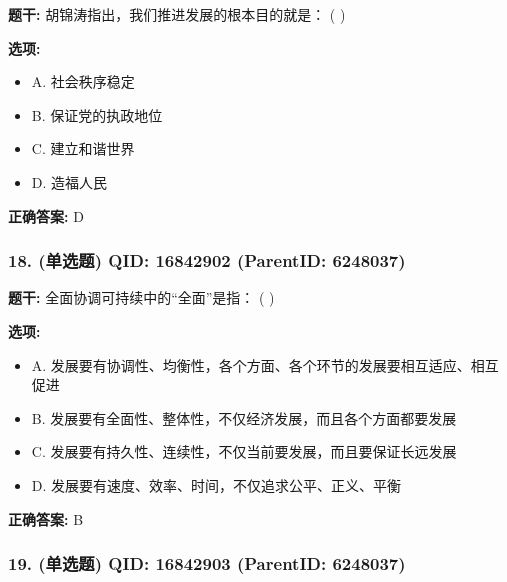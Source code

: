\documentclass[12pt,UTF8]{ctexart}
\begin{document}
\textbf{题干:}
胡锦涛指出，我们推进发展的根本目的就是： ( )



\textbf{选项:}
\begin{itemize}[leftmargin=*]

  \item A. 社会秩序稳定

  \item B. 保证党的执政地位

  \item C. 建立和谐世界

  \item D. 造福人民

\end{itemize}

\textbf{正确答案:}
D

\vspace{0.3em}\hrulefill\vspace{0.7em}

\subsubsection*{18. (单选题) \small QID: 16842902 (ParentID: 6248037)}

\textbf{题干:}
全面协调可持续中的“全面”是指： ( )



\textbf{选项:}
\begin{itemize}[leftmargin=*]

  \item A. 发展要有协调性、均衡性，各个方面、各个环节的发展要相互适应、相互促进

  \item B. 发展要有全面性、整体性，不仅经济发展，而且各个方面都要发展

  \item C. 发展要有持久性、连续性，不仅当前要发展，而且要保证长远发展

  \item D. 发展要有速度、效率、时间，不仅追求公平、正义、平衡

\end{itemize}

\textbf{正确答案:}
B

\vspace{0.3em}\hrulefill\vspace{0.7em}

\subsubsection*{19. (单选题) \small QID: 16842903 (ParentID: 6248037)}
\end{document}
